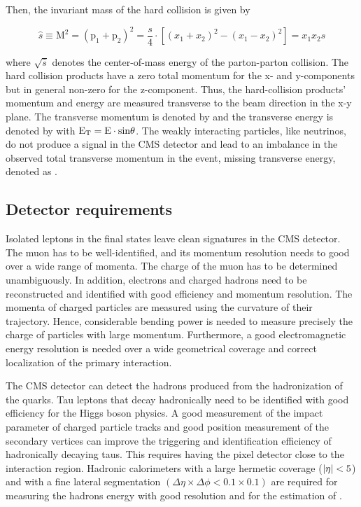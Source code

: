 Then, the invariant mass of the hard collision is given by

\begin{equation}
  \hat{s} \equiv \text{M}^{2}=\left(\text{p}_{1}+\text{p}_{2}\right)^{2}=\frac{s}{4} \cdot\left[\left(x_{1}+x_{2}\right)^{2}-\left(x_{1}-x_{2}\right)^{2}\right]=x_{1} x_{2} s
\end{equation}

where $\sqrt{\hat{s}}$ denotes the center-of-mass energy of the parton-parton collision. The hard collision products have a zero total momentum for the x- and y-components but in general non-zero for the z-component. Thus, the hard-collision products' momentum and energy are measured transverse to the beam direction in the x-y plane. The transverse momentum is denoted by \pt and the transverse energy is denoted by \ET with $\text{E}_\text{T} = \text{E} \cdot \text{sin} \theta$. The weakly interacting particles, like neutrinos, do not produce a signal in the CMS detector and lead to an imbalance in the observed total transverse momentum in the event, missing transverse energy, denoted as \met.

\subsection{Detector requirements}
Isolated leptons in the final states leave clean signatures in the CMS detector. The muon has to be well-identified, and its momentum resolution needs to good over a wide range of momenta. The charge of the muon has to be determined unambiguously. In addition, electrons and charged hadrons need to be reconstructed and identified with good efficiency and momentum resolution. The momenta of charged particles are measured using the curvature of their trajectory. Hence, considerable bending power is needed to measure precisely the charge of particles with large momentum. Furthermore, a good electromagnetic energy resolution is needed over a wide geometrical coverage and correct localization of the primary interaction.

The CMS detector can detect the hadrons produced from the hadronization of the quarks. Tau leptons that decay hadronically need to be identified with good efficiency for the Higgs boson physics. A good measurement of the impact parameter of charged particle tracks and good position measurement of the secondary vertices can improve the triggering and identification efficiency of hadronically decaying taus. This requires having the pixel detector close to the interaction region. Hadronic calorimeters with a large hermetic coverage ($\lvert\eta\rvert < 5$) and with a fine lateral segmentation $(\Delta \eta \times \Delta \phi < 0.1 \times 0.1)$ are required for measuring the hadrons energy with good resolution and for the estimation of \met.

